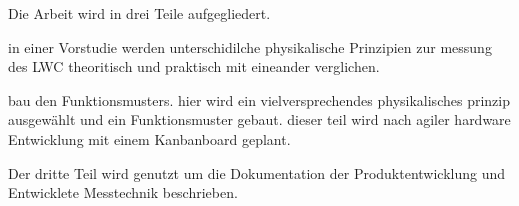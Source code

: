 Die Arbeit wird in drei Teile aufgegliedert.

in einer Vorstudie werden unterschidilche physikalische Prinzipien zur messung des LWC theoritisch und praktisch mit eineander verglichen.

bau den Funktionsmusters. hier wird ein vielversprechendes physikalisches prinzip ausgewählt und ein Funktionsmuster gebaut. dieser teil wird nach agiler hardware Entwicklung mit einem Kanbanboard geplant.

Der dritte Teil wird genutzt um die Dokumentation der Produktentwicklung und Entwicklete Messtechnik beschrieben.
